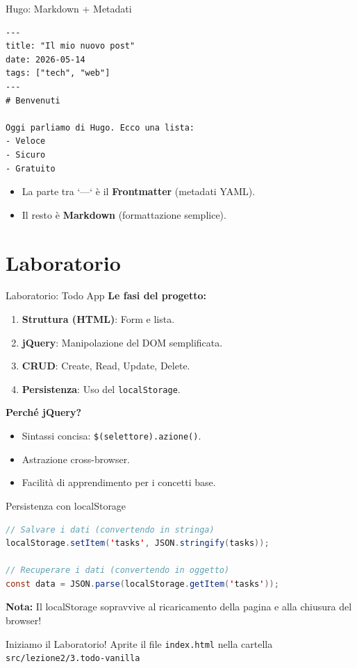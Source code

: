 \documentclass[10pt]{beamer}
\begin{document}
\begin{frame}[fragile]{Hugo: Markdown + Metadati}
    \begin{lstlisting}
---
title: "Il mio nuovo post"
date: 2026-05-14
tags: ["tech", "web"]
---
# Benvenuti

Oggi parliamo di Hugo. Ecco una lista:
- Veloce
- Sicuro
- Gratuito
    \end{lstlisting}
    \begin{itemize}
        \item La parte tra `---` è il \textbf{Frontmatter} (metadati YAML).
        \item Il resto è \textbf{Markdown} (formattazione semplice).
    \end{itemize}
\end{frame}

\section{Laboratorio}
\begin{frame}{Laboratorio: Todo App}
    \textbf{Le fasi del progetto:}
    \begin{enumerate}
        \item \textbf{Struttura (HTML)}: Form e lista.
        \item \textbf{jQuery}: Manipolazione del DOM semplificata.
        \item \textbf{CRUD}: Create, Read, Update, Delete.
        \item \textbf{Persistenza}: Uso del \texttt{localStorage}.
    \end{enumerate}
    \vspace{0.3cm}
    \textbf{Perché jQuery?}
    \begin{itemize}
        \item Sintassi concisa: \texttt{\$(selettore).azione()}.
        \item Astrazione cross-browser.
        \item Facilità di apprendimento per i concetti base.
    \end{itemize}
\end{frame}

\begin{frame}[fragile]{Persistenza con localStorage}
    \begin{lstlisting}[language=Java]
// Salvare i dati (convertendo in stringa)
localStorage.setItem('tasks', JSON.stringify(tasks));

// Recuperare i dati (convertendo in oggetto)
const data = JSON.parse(localStorage.getItem('tasks'));
    \end{lstlisting}
    \vspace{0.3cm}
    \textbf{Nota:} Il localStorage sopravvive al ricaricamento della pagina e alla chiusura del browser!
\end{frame}

\begin{frame}
    \centering
    \Huge \textcolor{primary}{Iniziamo il Laboratorio!}
    \vspace{1cm}
    \normalsize
    Aprite il file \texttt{index.html} nella cartella \texttt{src/lezione2/3.todo-vanilla}
\end{frame}
\end{document}
